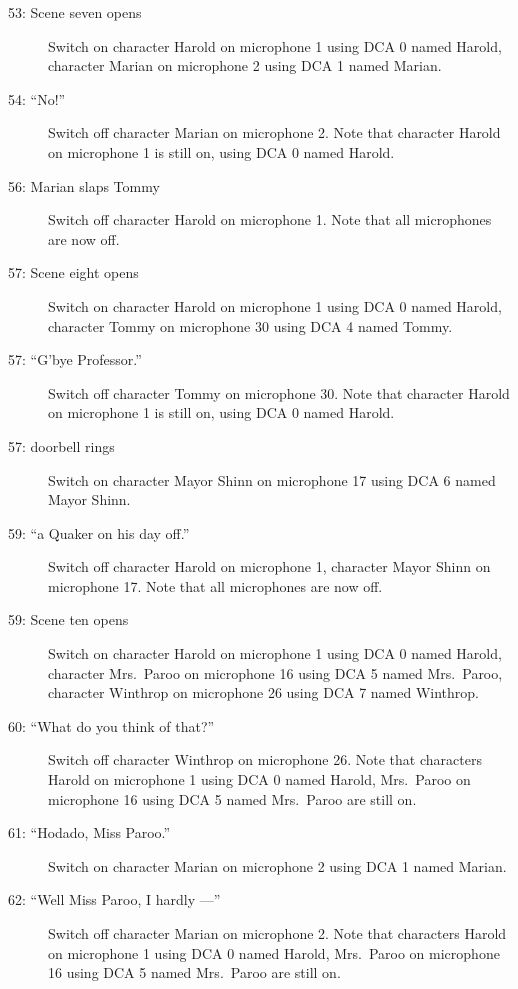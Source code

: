 \begin{description}
\item[53: Scene seven opens]
Switch on character Harold on microphone 1 using DCA 0 named Harold, character Marian on microphone 2 using DCA 1 named Marian. 

\item[54: ``No!'']
Switch off character Marian on microphone 2. Note that character Harold on microphone 1 is still on, using DCA 0 named Harold.

\item[56: Marian slaps Tommy]
Switch off character Harold on microphone 1. Note that all microphones are now off.

\item[57: Scene eight opens]
Switch on character Harold on microphone 1 using DCA 0 named Harold, character Tommy on microphone 30 using DCA 4 named Tommy. 

\item[57: ``G'bye Professor.'']
Switch off character Tommy on microphone 30. Note that character Harold on microphone 1 is still on, using DCA 0 named Harold.

\item[57: doorbell rings]
Switch on character Mayor Shinn on microphone 17 using DCA 6 named Mayor Shinn. 

\item[59: ``a Quaker on his day off.'']
Switch off character Harold on microphone 1, character Mayor Shinn on microphone 17. Note that all microphones are now off.

\item[59: Scene ten opens]
Switch on character Harold on microphone 1 using DCA 0 named Harold, character Mrs.~Paroo on microphone 16 using DCA 5 named Mrs.~Paroo, character Winthrop on microphone 26 using DCA 7 named Winthrop. 

\item[60: ``What do you think of that?'']
Switch off character Winthrop on microphone 26. Note that characters Harold on microphone 1 using DCA 0 named Harold, Mrs.~Paroo on microphone 16 using DCA 5 named Mrs.~Paroo are still on.  

\item[61: ``Hodado, Miss Paroo.'']
Switch on character Marian on microphone 2 using DCA 1 named Marian. 

\item[62: ``Well Miss Paroo, I hardly ---'']
Switch off character Marian on microphone 2. Note that characters Harold on microphone 1 using DCA 0 named Harold, Mrs.~Paroo on microphone 16 using DCA 5 named Mrs.~Paroo are still on.  


\end{description}
